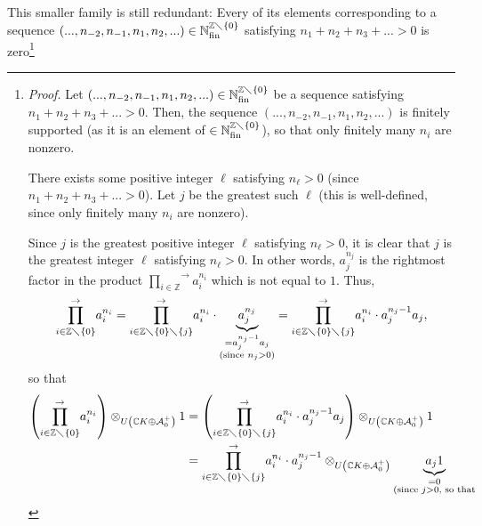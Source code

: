 \documentclass[etingof-lie.tex]{subfiles}
\begin{document}
This smaller family is still redundant: Every of its elements corresponding to
a sequence $\left(  ...,n_{-2},n_{-1},n_{1},n_{2},...\right)  \in
\mathbb{N}_{\operatorname*{fin}}^{\mathbb{Z}\diagdown\left\{  0\right\}  }$
satisfying $n_{1}+n_{2}+n_{3}+...>0$ is zero\footnote{\textit{Proof.} Let
$\left(  ...,n_{-2},n_{-1},n_{1},n_{2},...\right)  \in\mathbb{N}%
_{\operatorname*{fin}}^{\mathbb{Z}\diagdown\left\{  0\right\}  }$ be a
sequence satisfying $n_{1}+n_{2}+n_{3}+...>0$. Then, the sequence $\left(
...,n_{-2},n_{-1},n_{1},n_{2},...\right)  $ is finitely supported (as it is an
element of $\in\mathbb{N}_{\operatorname*{fin}}^{\mathbb{Z}\diagdown\left\{
0\right\}  }$), so that only finitely many $n_{i}$ are nonzero.
\par
There exists some positive integer $\ell$ satisfying $n_{\ell}>0$ (since
$n_{1}+n_{2}+n_{3}+...>0$). Let $j$ be the greatest such $\ell$ (this is
well-defined, since only finitely many $n_{i}$ are nonzero).
\par
Since $j$ is the greatest positive integer $\ell$ satisfying $n_{\ell}>0$, it
is clear that $j$ is the greatest integer $\ell$ satisfying $n_{\ell}>0$. In
other words, $a_{j}^{n_{j}}$ is the rightmost factor in the product
$\overset{\rightarrow}{\prod\limits_{i\in\mathbb{Z}}}a_{i}^{n_{i}}$ which is
not equal to $1$. Thus,%
\[
\overset{\rightarrow}{\prod\limits_{i\in\mathbb{Z}\diagdown\left\{  0\right\}
}}a_{i}^{n_{i}}=\overset{\rightarrow}{\prod\limits_{i\in\mathbb{Z}%
\diagdown\left\{  0\right\}  \diagdown\left\{  j\right\}  }}a_{i}^{n_{i}}%
\cdot\underbrace{a_{j}^{n_{j}}}_{\substack{=a_{j}^{n_{j}-1}a_{j}\\\text{(since
}n_{j}>0\text{)}}}=\overset{\rightarrow}{\prod\limits_{i\in\mathbb{Z}%
\diagdown\left\{  0\right\}  \diagdown\left\{  j\right\}  }}a_{i}^{n_{i}}\cdot
a_{j}^{n_{j}-1}a_{j},
\]
so that%
\begin{align*}
\left(  \overset{\rightarrow}{\prod\limits_{i\in\mathbb{Z}\diagdown\left\{
0\right\}  }}a_{i}^{n_{i}}\right)  \otimes_{U\left(  \mathbb{C}K\oplus
\mathcal{A}_{0}^{+}\right)  }1  &  =\left(  \overset{\rightarrow
}{\prod\limits_{i\in\mathbb{Z}\diagdown\left\{  0\right\}  \diagdown\left\{
j\right\}  }}a_{i}^{n_{i}}\cdot a_{j}^{n_{j}-1}a_{j}\right)  \otimes_{U\left(
\mathbb{C}K\oplus\mathcal{A}_{0}^{+}\right)  }1\\
&  =\overset{\rightarrow}{\prod\limits_{i\in\mathbb{Z}\diagdown\left\{
0\right\}  \diagdown\left\{  j\right\}  }}a_{i}^{n_{i}}\cdot a_{j}^{n_{j}%
-1}\otimes_{U\left(  \mathbb{C}K\oplus\mathcal{A}_{0}^{+}\right)
}\underbrace{a_{j}1}_{\substack{=0\\\text{(since }j>0\text{, so that}%
}}
\end{align*}}
\end{document}
